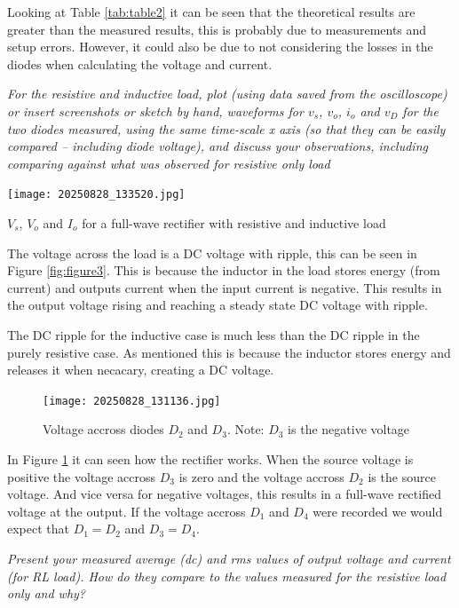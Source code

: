 \documentclass[12pt,a4paper]{article}
\begin{document}
Looking at Table \ref{tab:table2} it can be seen that the theoretical results are greater than the measured results, this is probably due to measurements and setup errors. However, it could also be due to not considering the losses in the diodes when calculating the voltage and current.

\textit{For the resistive and inductive load, plot (using data saved from the oscilloscope) or insert
screenshots or sketch by hand, waveforms for $v_s$, $v_o$, $i_o$ and $v_D$ for the two diodes measured, using
the same time-scale x axis (so that they can be easily compared – including diode voltage), and
discuss your observations, including comparing against what was observed for resistive only load}\\

\begin{center}
\texttt{[image: 20250828\_133520.jpg]}
\caption{\(V_s\), \(V_o\) and \(I_o\) for a full-wave rectifier with resistive and inductive load \label{fig:figure3}}
\end{center}

The voltage across the load is a DC voltage with ripple, this can be seen in Figure \ref{fig:figure3}. This is because the inductor in the load stores energy (from current) and outputs current when the input current is negative. This results in the output voltage rising and reaching a steady state DC voltage with ripple.

The DC ripple for the inductive case is much less than the DC ripple in the purely resistive case. As mentioned this is because the inductor stores energy and releases it when necacary, creating a DC voltage.

\begin{figure}[H]
\centering
\texttt{[image: 20250828\_131136.jpg]}
\caption{Voltage accross diodes \(D_2\) and \(D_3\). Note: \(D_3\) is the negative voltage \label{fig:figure4}}
\end{figure}

In Figure \ref{fig:figure4} it can seen how the rectifier works. When the source voltage is positive the voltage accross \(D_3\) is zero and the voltage accross \(D_2\) is the source voltage. And vice versa for negative voltages, this results in a full-wave rectified voltage at the output. If the voltage accross \(D_1\) and \(D_4\) were recorded we would expect that \(D_1 = D_2\) and \(D_3 = D_4\).

\textit{Present your measured average (dc) and rms values of output voltage and current (for RL load).
How do they compare to the values measured for the resistive load only and why?}\\
\end{document}
